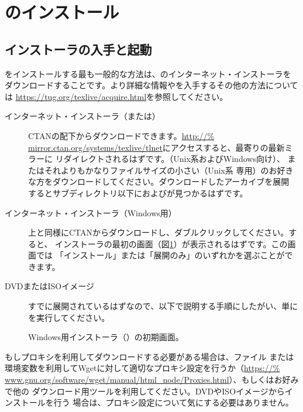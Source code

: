 \documentclass[uplatex,dvipdfmx,12pt,tombow]{jsarticle}
\begin{document}
\section{\TL のインストール}
\label{sec:install}

\subsection{インストーラの入手と起動}
\label{sec:inst-start}

\TL をインストールする最も一般的な方法は、\TL のインターネット・インストーラを
ダウンロードすることです。より詳細な情報や\TL を入手するその他の方法については
\url{https://tug.org/texlive/acquire.html}を参照してください。
%
\begin{description}
\item[インターネット・インストーラ（または）]
CTANの配下からダウンロードできます。\url{http://%
mirror.ctan.org/systems/texlive/tlnet}にアクセスすると、最寄りの最新ミラーに
リダイレクトされるはずです。（Unix系およびWindows向け）、
またはそれよりもかなりファイルサイズの小さい（Unix系
専用）のお好きな方をダウンロードしてください。ダウンロードしたアーカイブを展開
するとサブディレクトリ以下におよびが見つかるはずです。

\item[インターネット・インストーラ（Windows用）]
上と同様にCTANからダウンロードし、ダブルクリックしてください。すると、
インストーラの最初の画面（図\ref{fig:nsis}）が表示されるはずです。この画面では
「インストール」または「展開のみ」のいずれかを選ぶことができます。

\item[DVDまたはISOイメージ]
すでに展開されているはずなので、以下で説明する手順にしたがい、単にを実行してください。
\end{description}
%
\begin{figure}[tb]
\caption{Windows用インストーラ（）の初期画面。}
\label{fig:nsis}
\end{figure}

もしプロキシを利用してダウンロードする必要がある場合は、ファイル
または環境変数を利用してWgetに対して適切なプロキシ設定を行うか（\url{https://%
www.gnu.org/software/wget/manual/html_node/Proxies.html}）、もしくはお好みで他の
ダウンロード用ツールを利用してください。DVDやISOイメージからインストールを行う
場合は、プロキシ設定について気にする必要はありません。
\end{document}
